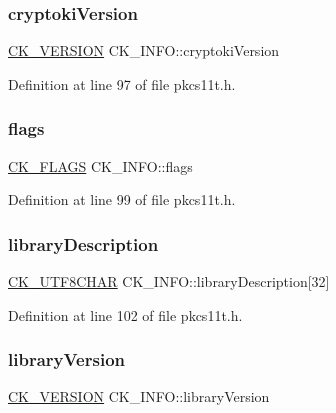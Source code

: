 \subsubsection{\texorpdfstring{cryptoki\+Version}{cryptokiVersion}}
{\footnotesize\ttfamily \hyperlink{struct_c_k___v_e_r_s_i_o_n}{C\+K\+\_\+\+V\+E\+R\+S\+I\+ON} C\+K\+\_\+\+I\+N\+F\+O\+::cryptoki\+Version}



Definition at line 97 of file pkcs11t.\+h.

\mbox{\label{struct_c_k___i_n_f_o_abac745e390f6328a4a75310d0af2c72a}} 
\subsubsection{\texorpdfstring{flags}{flags}}
{\footnotesize\ttfamily \hyperlink{pkcs11t_8h_a53850492c1ba57aca4332be791a3c6a3}{C\+K\+\_\+\+F\+L\+A\+GS} C\+K\+\_\+\+I\+N\+F\+O\+::flags}



Definition at line 99 of file pkcs11t.\+h.

\mbox{\label{struct_c_k___i_n_f_o_ac90912a7de0400710fa8a6cf9c8a5dfe}} 
\subsubsection{\texorpdfstring{library\+Description}{libraryDescription}}
{\footnotesize\ttfamily \hyperlink{pkcs11t_8h_a0b0f8118c33f8a96a6af834bbab1df0c}{C\+K\+\_\+\+U\+T\+F8\+C\+H\+AR} C\+K\+\_\+\+I\+N\+F\+O\+::library\+Description\mbox{[}32\mbox{]}}



Definition at line 102 of file pkcs11t.\+h.

\mbox{\label{struct_c_k___i_n_f_o_a6a0708856568d8d64a9da330d2e217a6}} 
\subsubsection{\texorpdfstring{library\+Version}{libraryVersion}}
{\footnotesize\ttfamily \hyperlink{struct_c_k___v_e_r_s_i_o_n}{C\+K\+\_\+\+V\+E\+R\+S\+I\+ON} C\+K\+\_\+\+I\+N\+F\+O\+::library\+Version}



